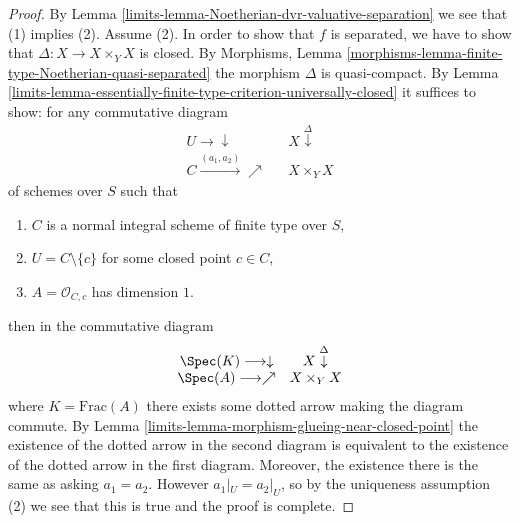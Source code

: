 \begin{proof}

By Lemma \ref{limits-lemma-Noetherian-dvr-valuative-separation} we see that
(1) implies (2). Assume (2). In order to show that $f$ is separated,
we have to show that $\Delta : X \to X \times_Y X$ is closed. By
Morphisms, Lemma \ref{morphisms-lemma-finite-type-Noetherian-quasi-separated}
the morphism $\Delta$ is quasi-compact.
By Lemma \ref{limits-lemma-essentially-finite-type-criterion-universally-closed}
it suffices to show: for any commutative diagram
$$
\begin{array}{ccc}U \longrightarrow\downarrow &  & X \overset{\Delta}{\downarrow} \\ C \overset{(a_1, a_2)}{\longrightarrow}\nearrow &  & X \times_Y X\end{array}
$$
of schemes over $S$ such that
\begin{enumerate}
\item $C$ is a normal integral scheme of finite type over $S$,
\item $U = C \setminus \{c\}$ for some closed point $c \in C$,
\item $A = \mathcal{O}_{C, c}$ has dimension $1$.
\end{enumerate}
then in the commutative diagram
$$
\begin{array}{cc}\Spec(K) \longrightarrow\downarrow & X \overset{\Delta}{\downarrow} \\ \Spec(A) \longrightarrow\nearrow & X \times_Y X\end{array}
$$
where $K = \text{Frac}(A)$ there exists some dotted arrow
making the diagram commute. By
Lemma \ref{limits-lemma-morphism-glueing-near-closed-point}
the existence of the dotted arrow in the second diagram
is equivalent to the existence of the dotted arrow
in the first diagram. Moreover, the existence there
is the same as asking $a_1 = a_2$. However $a_1|_U = a_2|_U$, so
by the uniqueness assumption (2) we see that this is true
and the proof is complete.
\end{proof}

